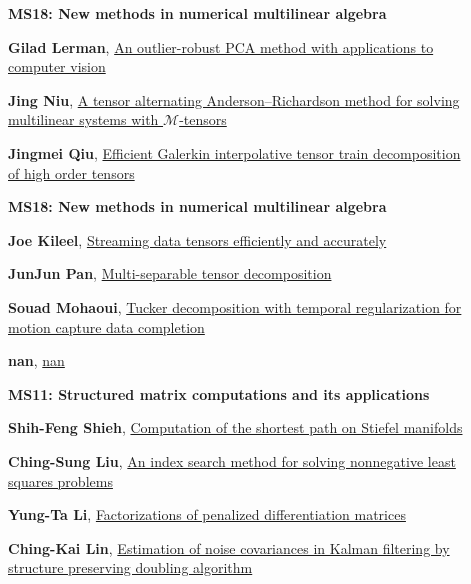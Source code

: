 \documentclass[ILAS2025-program.tex]{subfiles}
\begin{document}
        \begin{description}
    \item[] {\color{mstitle}\textbf{MS18: New methods in numerical multilinear algebra}} 
    \item[] \hypertarget{up0147}{}\textbf{Gilad Lerman}, \hyperlink{down0147}{An outlier-robust PCA method with applications to computer vision
}
        \item[] \hypertarget{up0148}{}\textbf{Jing Niu}, \hyperlink{down0148}{A tensor alternating Anderson--Richardson method for solving multilinear systems with $ \mathcal{M} $-tensors}
        \item[] \hypertarget{up0149}{}\textbf{Jingmei Qiu}, \hyperlink{down0149}{Efficient Galerkin interpolative tensor train decomposition of high order tensors
}
        \end{description}
    \begin{description}
    \item[] {\color{mstitle}\textbf{MS18: New methods in numerical multilinear algebra}} 
    \item[] \hypertarget{up0189}{}\textbf{Joe Kileel}, \hyperlink{down0189}{Streaming data tensors efficiently and accurately
}
        \item[] \hypertarget{up0190}{}\textbf{JunJun Pan}, \hyperlink{down0190}{Multi-separable tensor decomposition}
        \item[] \hypertarget{up0191}{}\textbf{Souad Mohaoui}, \hyperlink{down0191}{Tucker decomposition with temporal regularization for motion capture data completion}
        \item[] \hypertarget{up0192}{}\textbf{nan}, \hyperlink{down0192}{nan}
        \end{description}
    \begin{description}
    \item[] {\color{mstitle}\textbf{MS11: Structured matrix computations and its applications}} 
    \item[] \hypertarget{up0233}{}\textbf{Shih-Feng Shieh}, \hyperlink{down0233}{Computation of the shortest path on Stiefel manifolds}
        \item[] \hypertarget{up0234}{}\textbf{Ching-Sung Liu}, \hyperlink{down0234}{An index search method for solving nonnegative least squares problems
}
        \item[] \hypertarget{up0235}{}\textbf{Yung-Ta Li}, \hyperlink{down0235}{Factorizations of penalized differentiation matrices
}
        \item[] \hypertarget{up0236}{}\textbf{Ching-Kai Lin}, \hyperlink{down0236}{Estimation of noise covariances in Kalman filtering by structure preserving doubling algorithm}
        \end{description}
    \newpage
\end{document}
